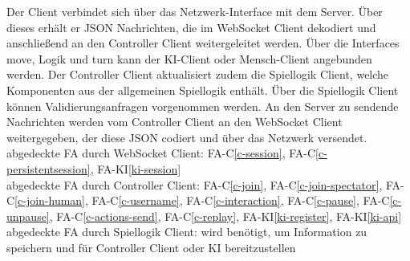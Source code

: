 \newpage
Der Client verbindet sich über das Netzwerk-Interface mit dem Server. Über dieses erhält er JSON Nachrichten, die im WebSocket Client dekodiert und anschließend an den Controller Client weitergeleitet werden. Über die Interfaces move, Logik und turn kann der KI-Client oder Mensch-Client angebunden werden. Der Controller Client aktualisiert zudem die Spiellogik Client, welche Komponenten aus der allgemeinen Spiellogik enthält. Über die Spiellogik Client können Validierungsanfragen vorgenommen werden. An den Server zu sendende Nachrichten werden vom Controller Client an den WebSocket Client weitergegeben, der diese JSON codiert und über das Netzwerk versendet.\\ 
abgedeckte FA durch WebSocket Client: FA-C\ref{c-session}, FA-C\ref{c-persistentsession}, FA-KI\ref{ki-session}\\
abgedeckte FA durch Controller Client: FA-C\ref{c-join}, FA-C\ref{c-join-spectator}, FA-C\ref{c-join-human}, FA-C\ref{c-username}, FA-C\ref{c-interaction}, FA-C\ref{c-pause}, FA-C\ref{c-unpause}, FA-C\ref{c-actions-send}, FA-C\ref{c-replay}, FA-KI\ref{ki-register}, FA-KI\ref{ki-api}\\
abgedeckte FA durch Spiellogik Client: wird benötigt, um Information zu speichern und für Controller Client oder KI bereitzustellen\\

